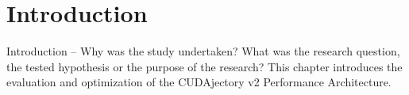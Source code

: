 \chapter{Introduction}
Introduction – Why was the study undertaken? What was the research question, the tested hypothesis or the purpose of the research?
This chapter introduces the evaluation and optimization of the CUDAjectory v2 Performance Architecture.


